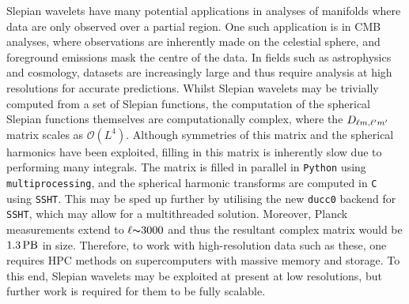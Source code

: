 Slepian wavelets have many potential applications in analyses of manifolds where data are only observed over a partial region.
One such application is in CMB analyses, where observations are inherently made on the celestial sphere, and foreground emissions mask the centre of the data.
In fields such as astrophysics and cosmology, datasets are increasingly large and thus require analysis at high resolutions for accurate predictions.
Whilst Slepian wavelets may be trivially computed from a set of Slepian functions, the computation of the spherical Slepian functions themselves are computationally complex, where the \(D_{\ell{} m,\ell' m'}{}\) matrix scales as \(\mathcal{O}(L^{4})\).
Although symmetries of this matrix and the spherical harmonics have been exploited, filling in this matrix is inherently slow due to performing many integrals.
The matrix is filled in parallel in \texttt{Python} using \texttt{multiprocessing}, and the spherical harmonic transforms are computed in \texttt{C} using \texttt{SSHT}.
This may be sped up further by utilising the new \texttt{ducc0} backend for \texttt{SSHT}, which may allow for a multithreaded solution.
Moreover, Planck measurements extend to \(\ell {\thicksim}3000\) and thus the resultant complex matrix would be \(\SI{1.3}{\peta\byte}\) in size.
Therefore, to work with high-resolution data such as these, one requires HPC methods on supercomputers with massive memory and storage.
To this end, Slepian wavelets may be exploited at present at low resolutions, but further work is required for them to be fully scalable.
